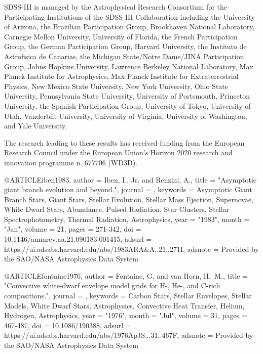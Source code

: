 \documentclass[a4paper,fleqn,usenatbib]{mnras}
\begin{document}
SDSS-III is managed by the Astrophysical Research Consortium for the Participating Institutions of the SDSS-III Collaboration including the University of Arizona, the Brazilian Participation Group, Brookhaven National Laboratory, Carnegie Mellon University, University of Florida, the French Participation Group, the German Participation Group, Harvard University, the Instituto de Astrofisica de Canarias, the Michigan State/Notre Dame/JINA Participation Group, Johns Hopkins University, Lawrence Berkeley National Laboratory, Max Planck Institute for Astrophysics, Max Planck Institute for Extraterrestrial Physics, New Mexico State University, New York University, Ohio State University, Pennsylvania State University, University of Portsmouth, Princeton University, the Spanish Participation Group, University of Tokyo, University of Utah, Vanderbilt University, University of Virginia, University of Washington, and Yale University.


The research leading to these results has received funding from the European Research Council under the European Union's Horizon 2020 research and innovation programme n. 677706 (WD3D).












@ARTICLE{iben1983,
       author = {{Iben}, I., Jr. and {Renzini}, A.},
        title = "{Asymptotic giant branch evolution and beyond.}",
      journal = {\araa},
     keywords = {Asymptotic Giant Branch Stars, Giant Stars, Stellar Evolution, Stellar Mass Ejection, Supernovae, White Dwarf Stars, Abundance, Pulsed Radiation, Star Clusters, Stellar Spectrophotometry, Thermal Radiation, Astrophysics},
         year = "1983",
        month = "Jan",
       volume = {21},
        pages = {271-342},
          doi = {10.1146/annurev.aa.21.090183.001415},
       adsurl = {https://ui.adsabs.harvard.edu/abs/1983ARA&A..21..271I},
      adsnote = {Provided by the SAO/NASA Astrophysics Data System}
}


@ARTICLE{fontaine1976,
       author = {{Fontaine}, G. and {van Horn}, H.~M.},
        title = "{Convective white-dwarf envelope model grids for H-, He-, and C-rich compositions.}",
      journal = {\apjs},
     keywords = {Carbon Stars, Stellar Envelopes, Stellar Models, White Dwarf Stars, Astrophysics, Convective Heat Transfer, Helium, Hydrogen, Astrophysics},
         year = "1976",
        month = "Jul",
       volume = {31},
        pages = {467-487},
          doi = {10.1086/190388},
       adsurl = {https://ui.adsabs.harvard.edu/abs/1976ApJS...31..467F},
      adsnote = {Provided by the SAO/NASA Astrophysics Data System}
}
\end{document}
